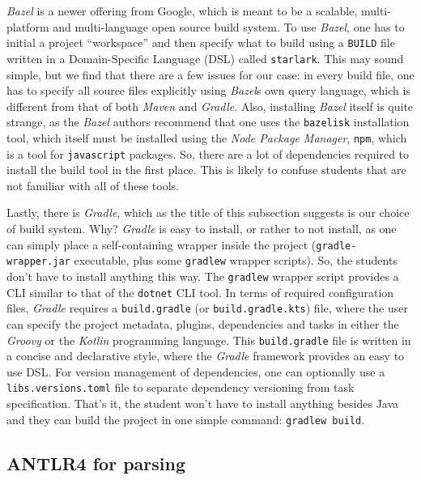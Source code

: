 \textit{Bazel} is a newer offering from Google, which is meant to be a scalable, multi-platform and multi-language open source
build system. To use \textit{Bazel}, one has to initial a project ``workspace'' and then specify what to build using a \texttt{BUILD}
file written in a Domain-Specific Language (DSL) called \texttt{starlark}. This may sound simple, but we find that there are a few
issues for our case: in every build file, one has to specify all source files explicitly using \textit{Bazel}s own query language,
which is different from that of both \textit{Maven} and \textit{Gradle}. Also, installing \textit{Bazel} itself is quite strange,
as the \textit{Bazel} authors recommend that one uses the \texttt{bazelisk} installation tool, which itself must be installed using
the \textit{Node Package Manager}, \texttt{npm}, which is a tool for \texttt{javascript} packages. So, there are a lot of dependencies
required to install the build tool in the first place. This is likely to confuse students that are not familiar with all of these tools.

Lastly, there is \textit{Gradle}, which as the title of this subsection suggests is our choice of build system. Why?
\textit{Gradle} is easy to install, or rather to not install, as one can simply place a self-containing wrapper inside the project
(\texttt{gradle-wrapper.jar} executable, plus some \texttt{gradlew} wrapper scripts). So, the students don't have to install anything
this way. The \texttt{gradlew} wrapper script provides a CLI similar to that of the \texttt{dotnet} CLI tool. In terms of required
configuration files, \textit{Gradle} requires a \texttt{build.gradle} (or \texttt{build.gradle.kts}) file, where the user can specify
the project metadata, plugins, dependencies and tasks in either the \textit{Groovy} or the \textit{Kotlin} programming language.
This \texttt{build.gradle} file is written in a concise and declarative style, where the \textit{Gradle} framework provides an
easy to use DSL. For version management of dependencies, one can optionally use a \texttt{libs.versions.toml} file to separate
dependency versioning from task specification. That's it, the student won't have to install anything besides Java and they
can build the project in one simple command: \texttt{gradlew build}.

\subsection{ANTLR4 for parsing}

